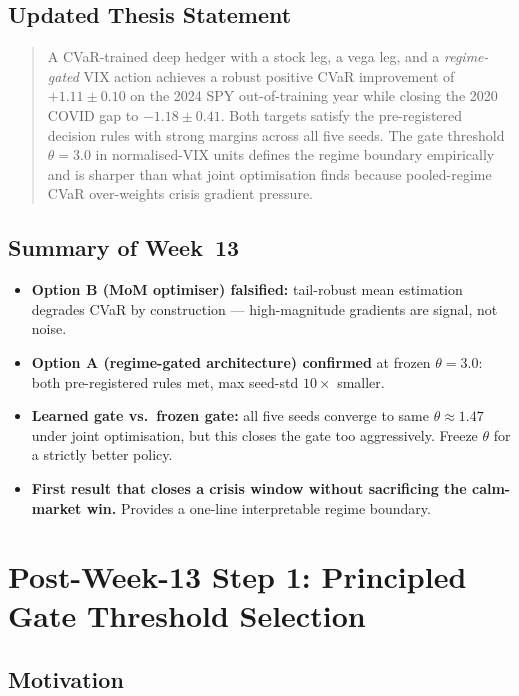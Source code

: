 \documentclass[11pt, a4paper]{article}
\begin{document}
\subsection{Updated Thesis Statement}

\begin{quote}
A CVaR-trained deep hedger with a stock leg, a vega leg, and a
\emph{regime-gated} VIX action achieves a robust positive CVaR improvement of
$+1.11 \pm 0.10$ on the 2024 SPY out-of-training year while closing the 2020
COVID gap to $-1.18 \pm 0.41$. Both targets satisfy the pre-registered
decision rules with strong margins across all five seeds. The gate threshold
$\theta = 3.0$ in normalised-VIX units defines the regime boundary empirically
and is sharper than what joint optimisation finds because pooled-regime CVaR
over-weights crisis gradient pressure.
\end{quote}

\subsection{Summary of Week~13}
\begin{itemize}
\item \textbf{Option B (MoM optimiser) falsified:} tail-robust mean estimation
      degrades CVaR by construction --- high-magnitude gradients are signal, not noise.
\item \textbf{Option A (regime-gated architecture) confirmed} at frozen $\theta=3.0$:
      both pre-registered rules met, max seed-std $10\times$ smaller.
\item \textbf{Learned gate vs.\ frozen gate:} all five seeds converge to same
      $\theta \approx 1.47$ under joint optimisation, but this closes the gate
      too aggressively. Freeze $\theta$ for a strictly better policy.
\item \textbf{First result that closes a crisis window without sacrificing
      the calm-market win.} Provides a one-line interpretable regime boundary.
\end{itemize}



\section{Post-Week-13 Step 1: Principled Gate Threshold Selection}
\label{sec:step1}

\subsection{Motivation}
\end{document}
